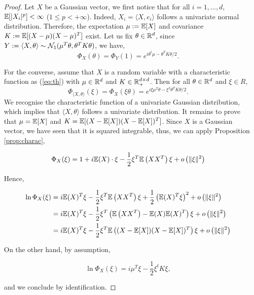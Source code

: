 \documentclass{article}
\begin{document}
\begin{proof}
  Let $X$ be a Gaussian vector, we first notice that for all $i=1,\ldots,d$,
  $\mathbb{E}[|X_i|^p] < \infty$ ($1\leq p < +\infty$). Indeed, $X_i = \langle X,e_i
  \rangle$ follows a univariate normal distribution. Therefore, the expectation
  $\mu:=\mathbb{E}[X]$ and covariance $K:=\mathbb{E}[(X-\mu)(X-\mu)^T]$ exist. 
  Let us fix $\theta \in \mathbb{R}^{d}$, since $Y:= \langle X,\theta \rangle \sim
  \mathcal{N}_1(\mu^T\theta, \theta^TK\theta)$, we have, $$\Phi_{X}(\theta) = \Phi_Y(1)
  = e^{i\theta^t\mu - \theta^TK\theta/2}.$$

  For the converse, assume that $X$ is a random variable with a characteristic
  function as (\ref{eq:th}) with $\mu \in \mathbb{R}^{d}$ and $K \in \mathbb{R}^{d\times d}_+$. Then
  for all $\theta \in \mathbb{R}^{d}$ and $\xi \in R$,
  $$\Phi_{\langle X,\theta \rangle}(\xi) = \Phi_X(\xi \theta)
  = e^{i \xi \mu^T\theta - \xi^2 \theta^TK\theta/2}.$$
  We recognise the characteristic function of a univariate Gaussian
  distribution, which implies that $\langle X,\theta \rangle$ follows a
  univariate distribution. It remains to prove that $\mu=\mathbb{E}[X]$ and
  $K=\mathbb{E}[(X-\mathbb{E}[X])(X-\mathbb{E}[X])^T]$. Since $X$ is a Gaussian vector, we have seen that it
  is squared integrable, thus, we can apply Proposition \ref{prop:charac},

  \begin{equation*}
    \Phi_{X}(\xi)=1 + i \mathbb{E}(X) \cdot \xi-\frac{1}{2} \xi^T \mathbb{E}\left(XX^T\right) \xi+o\left(\|\xi\|^{2}\right)
  \end{equation*}

  Hence,

  \begin{equation*}
    \begin{aligned}
      \ln \Phi_{X}(\xi) &= i \mathbb{E}(X)^T \xi-\frac{1}{2} \xi^T \mathbb{E}\left(XX^T\right) \xi +\frac{1}{2}\left(\mathbb{E}(X)^T \xi\right)^{2}+o\left(\|\xi\|^{2}\right) \\
      &= i \mathbb{E}(X)^T \xi-\frac{1}{2} \xi^T\left(\mathbb{E}\left(XX^T\right)-\mathbb{E}(X)\mathbb{E}(X)^T\right) \xi+o\left(\|\xi\|^{2}\right) \\
      &= i \mathbb{E}(X)^T \xi-\frac{1}{2} \xi^T\mathbb{E}\left((X-\mathbb{E}[X])(X-\mathbb{E}[X])^T\right) \xi+o\left(\|\xi\|^{2}\right)
    \end{aligned}
  \end{equation*}

  On the other hand, by assumption,

  \begin{equation*}
    \ln \Phi_{X}(\xi) = i \mu^T \xi-\frac{1}{2} \xi^t K \xi,
  \end{equation*}

  and we conclude by identification. 
\end{proof}
\end{document}
